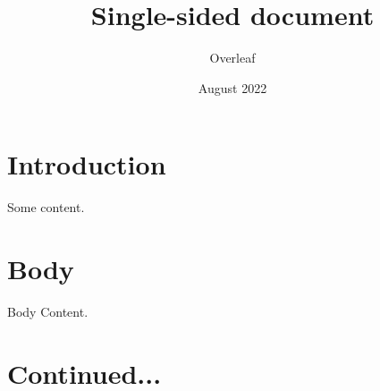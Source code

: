 \documentclass{article}
\begin{document}
	\pagestyle{fancy}
	\title{Single-sided document}
	\author{Overleaf}
	\date{August 2022}
	\fancyhf{} %
	\fancyfoot[L]{\thepage}
	\maketitle
	\section{Introduction}
	Some content.
	\newpage
	\section {Body}
	Body Content.
	\newpage
	\section{Continued...}
\end{document}
